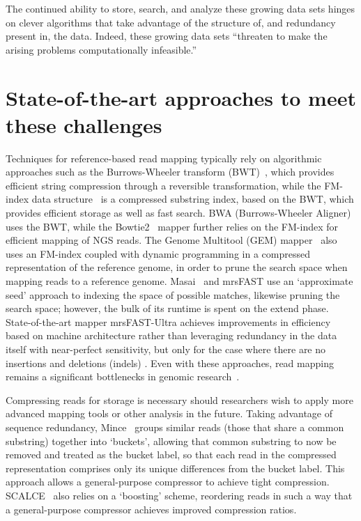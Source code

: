 \documentclass{acm_proc_article-sp}
\begin{document}
The continued ability to store, search, and analyze these growing data sets hinges on
clever algorithms that take advantage of the structure of, and redundancy 
present in, the data.
Indeed, these growing data sets ``threaten to make the arising problems 
computationally infeasible.''~\cite{berger2013computational}

\section{State-of-the-art approaches to meet these challenges}

Techniques for reference-based read mapping typically rely on algorithmic 
approaches such as the Burrows-Wheeler transform (BWT)~\cite{berger2013computational}, 
which provides efficient string 
compression through a reversible transformation, while the FM-index data 
structure~\cite{berger2013computational} is a compressed substring index, 
based on the BWT, which provides efficient storage as well as fast search.
BWA (Burrows-Wheeler Aligner)~\cite{berger2013computational} uses the BWT, while the 
Bowtie2~\cite{berger2013computational} mapper further relies on the FM-index for 
efficient mapping of NGS reads.
The Genome Multitool (GEM) mapper~\cite{marco2012gem} also uses an FM-index 
coupled with dynamic programming in a compressed representation of the 
reference genome, in order to prune the search space 
when mapping reads to a reference genome.
Masai~\cite{siragusa2013fast} and mrsFAST \cite{hach2010mrsfast} use an `approximate seed' approach to indexing
the space of possible matches, likewise pruning the search space; however, the
bulk of its runtime is spent on the extend phase.
State-of-the-art mapper mrsFAST-Ultra achieves improvements in efficiency based on machine architecture rather than leveraging redundancy in the data itself with near-perfect sensitivity, but
only for the case where there are no insertions and deletions (indels) \cite{hach2014mrsfast}.
Even with these approaches, read mapping remains a significant bottlenecks in
genomic research~\cite{berger2013computational}.

Compressing reads for storage is necessary should researchers wish to apply more advanced mapping tools or other analysis in the future.
Taking advantage of sequence redundancy, Mince~\cite{patro2015data} groups 
similar reads (those that share a common 
substring) together into `buckets', allowing that common substring to now be 
removed and treated as the bucket label, so that each read in the compressed 
representation comprises only its unique differences from the bucket label.
This approach allows a general-purpose compressor to achieve tight compression.
SCALCE~\cite{berger2013computational} also relies on a `boosting' scheme, 
reordering
reads in such a way that a general-purpose compressor achieves improved
compression ratios.
\end{document}

